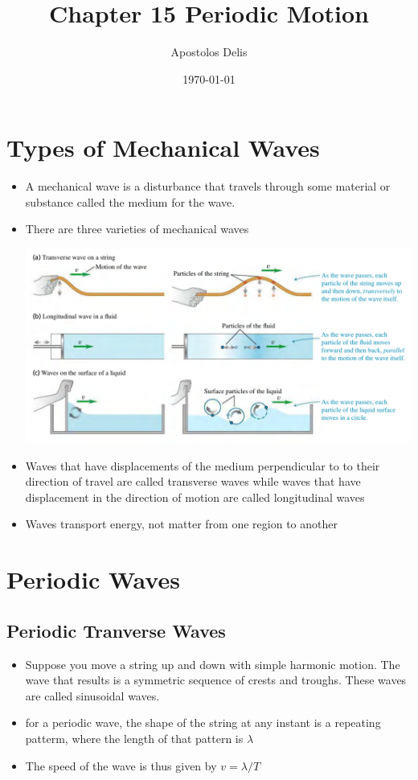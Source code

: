 \documentclass[11pt, a4paper]{article}
\begin{document}
\title{Chapter 15 Periodic Motion}
\author{Apostolos Delis}
\date{\today}
\maketitle

\tableofcontents
\section[15.1, Types of Mechanical Wabves]{Types of Mechanical Waves}
\begin{itemize}
    \item A mechanical wave is a disturbance that travels through some material or
        substance called the medium for the wave.
    \item There are three varieties of mechanical waves

\includegraphics[scale=0.65]{images/mech_waves.png}

    \item Waves that have displacements of the medium perpendicular to to their direction
        of travel are called transverse waves while waves that have displacement in
        the direction of motion are called longitudinal waves
    \item Waves transport energy, not matter from one region to another
\end{itemize}

\section[15.2, Periodic Waves]{Periodic Waves}

\subsection{Periodic Tranverse Waves}

\begin{itemize}
    \item Suppose you move a string up and down with simple harmonic motion. The wave
        that results is a symmetric sequence of crests and troughs. These waves are
        called sinusoidal waves.
    \item for a periodic wave, the shape of the string at any instant is a repeating patterm, 
        where the length of that pattern is $\lambda$ 
    \item The speed of the wave is thus given by $v = \lambda/T$
\end{itemize}
\end{document}
